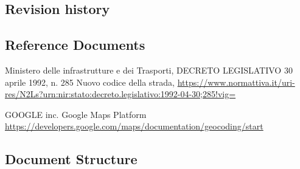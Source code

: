 \subsection{Revision history}


\subsection{Reference Documents}
\begin{thebibliography}{00}

 Ministero delle infrastrutture e dei Trasporti, DECRETO LEGISLATIVO 30 aprile 1992, n. 285 Nuovo codice della strada, \url{https://www.normattiva.it/uri-res/N2Ls?urn:nir:stato:decreto.legislativo:1992-04-30;285!vig=}

 GOOGLE inc. Google Maps Platform \url{https://developers.google.com/maps/documentation/geocoding/start}



\end{thebibliography}


\subsection{Document Structure}
